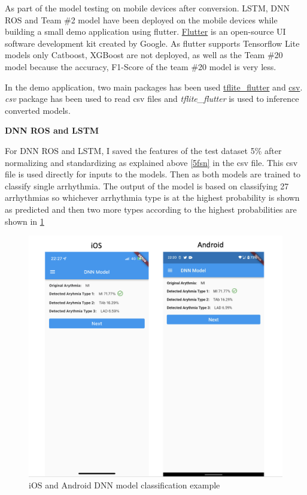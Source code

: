 As part of the model testing on mobile devices after conversion. LSTM, DNN ROS and Team \#2 model have been deployed on the mobile devices while building a small demo application using flutter. \href{https://flutter.dev/}{Flutter} is an open-source UI software development kit created by Google. As flutter supports Tensorflow Lite models only Catboost, XGBoost are not deployed, as well as the Team \#20 model because the accuracy, F1-Score of the team \#20 model is very less. 

In the demo application, two main packages has been used \href{https://pub.dev/packages/tflite\_flutter}{tflite\_flutter} and \href{https://pub.dev/packages/csv}{csv}. \textit{csv} package has been used to read csv files and \textit{tflite\_flutter} is used to inference converted models. 

\textbf{DNN ROS and LSTM}

For DNN ROS and LSTM, I saved the features of the test dataset 5\% after normalizing and standardizing as explained above \ref{5fsn} in the csv file. This csv file is used directly for inputs to the models. Then as both models are trained to classify single arrhythmia. The output of the model is based on classifying 27 arrhythmias so whichever arrhythmia type is at the highest probability is shown as predicted and then two more types according to the highest probabilities are shown in \ref{dnn_deloyment} 

\newpage 


\begin{figure}[H]
\centering
\includegraphics[scale=0.4]{img/dnn_deloyment.png}
\caption{iOS and Android DNN model classification example}
\label{dnn_deloyment}
\end{figure}


